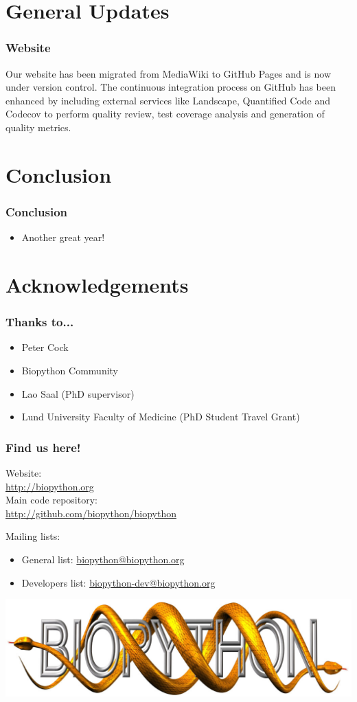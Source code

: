 \documentclass[trans]{beamer}
\begin{document}
\section{General Updates}
\frame
{
  \frametitle{Website}

Our website has been migrated from MediaWiki to GitHub Pages and is now under version control. The
continuous integration process on GitHub has been enhanced by including external services like Landscape,
Quantified Code and Codecov to perform quality review, test coverage analysis and generation of quality
metrics.
}


\section{Conclusion}
\frame
{
  \frametitle{Conclusion}

  \begin{itemize}
  \item Another great year!
  \end{itemize}
}

\section*{Acknowledgements}
\frame
{
  \frametitle{Thanks to...}

  \begin{itemize}
  \item Peter Cock
  \item Biopython Community
  \item Lao Saal (PhD supervisor)
  \item Lund University Faculty of Medicine (PhD Student Travel Grant)
  \end{itemize}
}

\frame
{
  \frametitle{Find us here!}

  \begin{center}
  Website:\\
  \url{http://biopython.org}\\
  Main code repository:\\
  \url{http://github.com/biopython/biopython}

  Mailing lists:

  \begin{itemize}
  \item General list: \url{biopython@biopython.org}
  \item Developers list: \url{biopython-dev@biopython.org}
  \end{itemize}

  \includegraphics[height=.2\textheight]{../abstract/biopython.jpg}
  \end{center}
}
\end{document}
